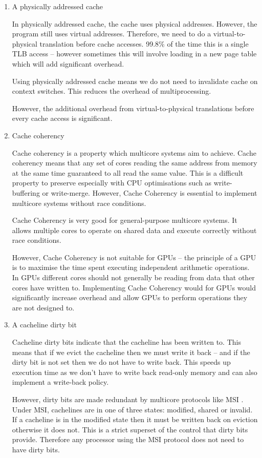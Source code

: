 \documentclass[10pt,\jkfside,a4paper]{article}
\begin{document}
\begin{enumerate}
\begin{enumerate}[label=(\alph*)]
\item A physically addressed cache

In physically addressed cache, the cache uses physical addresses. However,
the program still uses virtual addresses. Therefore, we need to do a
virtual-to-physical translation before cache accesses. 99.8\% of the time
this is a single TLB access -- however sometimes this will involve
loading in a new page table which will add significant overhead.

Using physically addressed cache means we do not need to invalidate cache on
context switches. This reduces the overhead of multiprocessing.

However, the additional overhead from virtual-to-physical translations
before every cache access is significant.

\item Cache coherency

Cache coherency is a property which multicore systems aim to achieve. Cache
coherency means that any set of cores reading the same address from memory
at the same time guaranteed to all read the same value. This is a difficult
property to preserve especially with CPU optimisations such as
write-buffering or write-merge. However, Cache Coherency is essential to
implement multicore systems without race conditions.

Cache Coherency is very good for general-purpose multicore systems. It
allows multiple cores to operate on shared data and execute correctly
without race conditions.

However, Cache Coherency is not suitable for GPUs -- the principle of a GPU
is to maximise the time spent executing independent arithmetic operations. In
GPUs different cores should not generally be reading from data that other
cores have written to. Implementing Cache Coherency would for GPUs would
significantly increase overhead and allow GPUs to perform operations they
are not designed to.

\item A cacheline dirty bit

Cacheline dirty bits indicate that the cacheline has been written to. This
means that if we evict the cacheline then we must write it back -- and if
the dirty bit is not set then we do not have to write back. This speeds up
execution time as we don't have to write back read-only memory and can also
implement a write-back policy.

However, dirty bits are made redundant by multicore protocols like MSI .
Under MSI, cachelines are in one of three states: modified, shared or
invalid. If a cacheline is in the modified state then it must be written
back on eviction otherwise it does not. This is a strict superset of the
control that dirty bits provide. Therefore any processor using the MSI
protocol does not need to have dirty bits.


\end{enumerate}
\end{enumerate}
\end{document}

